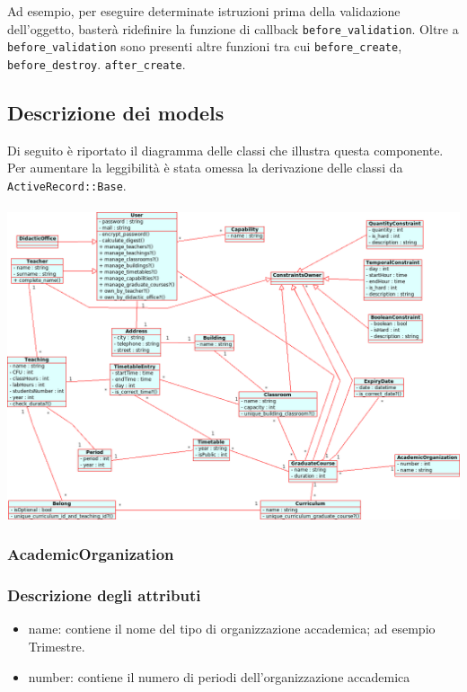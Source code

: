 \documentclass[11pt,a4paper]{article}
\begin{document}
Ad esempio, per eseguire determinate istruzioni prima della validazione dell'oggetto, basterà ridefinire la funzione di callback \verb|before_validation|.
Oltre a \verb|before_validation| sono presenti altre funzioni tra cui \verb|before_create|, \verb|before_destroy|. \verb|after_create|.
\subsection{Descrizione dei models}
Di seguito è riportato il diagramma delle classi che illustra questa componente. Per aumentare la leggibilità è stata omessa la derivazione delle classi da \verb|ActiveRecord::Base|. \\
\bigskip \\
\includegraphics[scale=0.34]{images/Model_ClassDiagram.png}
\subsubsection{AcademicOrganization}
\subsubsection*{Descrizione degli attributi}
\begin{itemize}
 \item name: contiene il nome del tipo di organizzazione accademica; ad esempio Trimestre.
 \item number: contiene il numero di periodi dell'organizzazione accademica
\end{itemize}
\end{document}
